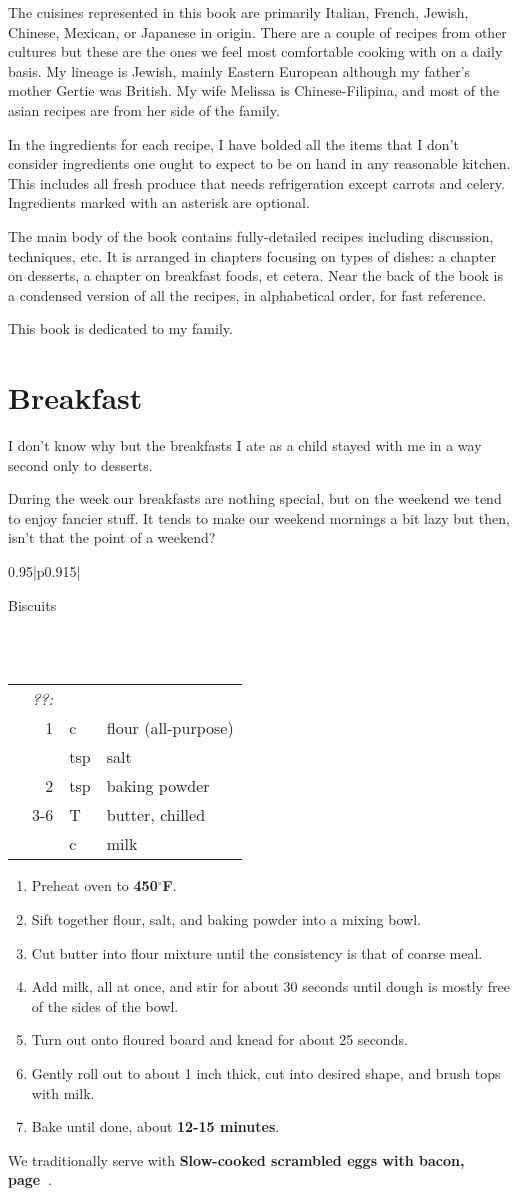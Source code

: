 \documentclass[8pt]{report}
\newcommand{\ingredmargin}{0.25cm}
\newcommand{\F}{$^\circ$F}
\newcommand{\recipegroup}[2]{\chapter*{#1} \addcontentsline{toc}{chapter}{#1} \label{chap:#1} \vspace{4cm} {#2} \newpage}
\newcommand{\fr}[2]{\nicefrac{#1}{#2}}
\newcommand{\recipereff}[2]{{\bf #1 #2, page~\pageref{rec:#1}}}
\newenvironment{recipe}[3]
  {\bigskip \bigskip 
\begin{tabular*}{0.95\textwidth}{|p{0.915\textwidth}|} \hline \vspace{0.25mm}
\begin{minipage}{0.7\textwidth}	\begin{flushleft} {\Large \textsf{#1}} \end{flushleft} \end{minipage}
\begin{minipage}{0.2\textwidth} \begin{flushright} \emph{#2} \end{flushright} \end{minipage} \\ \\ \hline
\begin{ingreds}{#3} \addcontentsline{toc}{section}{#1} \phantomsection \label{rec:#1}} 
  {\\ \hline \end{tabular*} \noindent}
\newenvironment{ingreds}[1]
  {\begin{tabular}{lrlp{0.6\textwidth}} \hspace{\ingredmargin} & \multicolumn{3}{l}{\it #1:} \\}
  {\end{tabular} \medskip}
\newcommand{\ingredsdone}{\end{ingreds}\begin{enumerate}}
\newcommand{\stepsdone}{\end{enumerate} \medskip}
\newcommand{\notefont}{\renewcommand*\rmdefault{pzc}\normalfont\upshape \large}
\newcommand{\ingredient}[3]{\hspace{\ingredmargin} & #1 & #2 & #3 \\}
\begin{document}
The cuisines represented in this book are primarily Italian, French, Jewish, Chinese, Mexican, or Japanese in origin.  There are a couple of recipes from other cultures but these are the ones we feel most comfortable cooking with on a daily basis.  My lineage is Jewish, mainly Eastern European although my father's mother Gertie was British.  My wife Melissa is Chinese-Filipina, and most of the asian recipes are from her side of the family.

In the ingredients for each recipe, I have bolded all the items that I don't consider ingredients one ought to expect to be on hand in any reasonable kitchen.  This includes all fresh produce that needs refrigeration except carrots and celery.  Ingredients marked with an asterisk are optional.  

The main body of the book contains fully-detailed recipes including discussion, techniques, etc.  It is arranged in chapters focusing on types of dishes: a chapter on desserts, a chapter on breakfast foods, et cetera.  Near the back of the book is a condensed version of all the recipes, in alphabetical order, for fast reference.  

\bigskip
This book is dedicated to my family.

\newpage
{}
\recipegroup{Breakfast}{\notefont 
I don't know why but the breakfasts I ate as a child stayed with me in a way second only to desserts.

During the week our breakfasts are nothing special, but on the weekend we tend to enjoy fancier stuff.  It tends to make our weekend mornings a bit lazy but then, isn't that the point of a weekend?  
}


\begin{recipe}{Biscuits}{}{??}
\ingredient{1 \fr34}{c}{flour (all-purpose)}
\ingredient{\fr12}{tsp}{salt}
\ingredient{2 \fr12}{tsp}{baking powder}
\ingredient{3-6}{T}{butter, chilled}
\ingredient{\fr23}{c}{milk}
\ingredsdone
\item Preheat oven to {\bf 450\F}.
\item Sift together flour, salt, and baking powder into a mixing bowl.
\item Cut butter into flour mixture until the consistency is that of coarse meal.
\item Add milk, all at once, and stir for about 30 seconds until dough is mostly free of the sides of the bowl.
\item Turn out onto floured board and knead for about 25 seconds.
\item Gently roll out to about 1 inch thick, cut into desired shape, and brush tops with milk.
\item Bake until done, about {\bf 12-15 minutes}.
\stepsdone
We traditionally serve with \recipereff{Slow-cooked scrambled eggs}{with bacon}.
\end{recipe}
\end{document}
